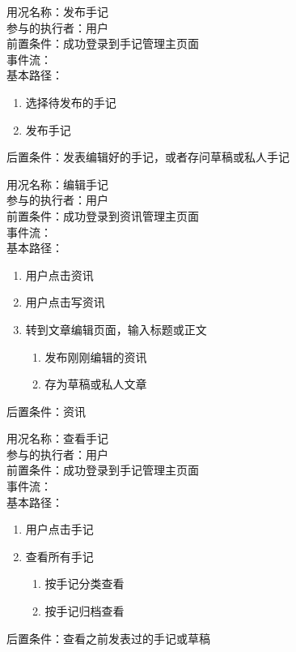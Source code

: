 \begin{framed}
\noindent
用况名称：发布手记\\
参与的执行者：用户\\
前置条件：成功登录到手记管理主页面\\
事件流：\\
基本路径：
\begin{enumerate}[itemsep=2pt,topsep=0pt,parsep=0pt,itemindent=1em]
    \item 选择待发布的手记
    \item 发布手记
\end{enumerate}
\noindent
后置条件：发表编辑好的手记，或者存问草稿或私人手记
\end{framed}

\begin{framed}
\noindent
用况名称：编辑手记\\
参与的执行者：用户\\
前置条件：成功登录到资讯管理主页面\\
事件流：\\
基本路径：
\begin{enumerate}[itemsep=2pt,topsep=0pt,parsep=0pt,itemindent=1em]
    \item 用户点击资讯
    \item 用户点击写资讯
    \item 转到文章编辑页面，输入标题或正文
    \begin{enumerate}[itemsep=2pt,topsep=0pt,parsep=0pt,itemindent=1em]
          \item 发布刚刚编辑的资讯
          \item 存为草稿或私人文章 
      \end{enumerate}
\end{enumerate}
\noindent
后置条件：资讯
\end{framed}

\begin{framed}
\noindent
用况名称：查看手记\\
参与的执行者：用户\\
前置条件：成功登录到手记管理主页面\\
事件流：\\
基本路径：
\begin{enumerate}[itemsep=2pt,topsep=0pt,parsep=0pt,itemindent=1em]
    \item 用户点击手记
    \item 查看所有手记
    \begin{enumerate}[itemsep=2pt,topsep=0pt,parsep=0pt,itemindent=1em]
          \item 按手记分类查看
          \item 按手记归档查看
      \end{enumerate}
\end{enumerate}
\noindent
后置条件：查看之前发表过的手记或草稿
\end{framed}

